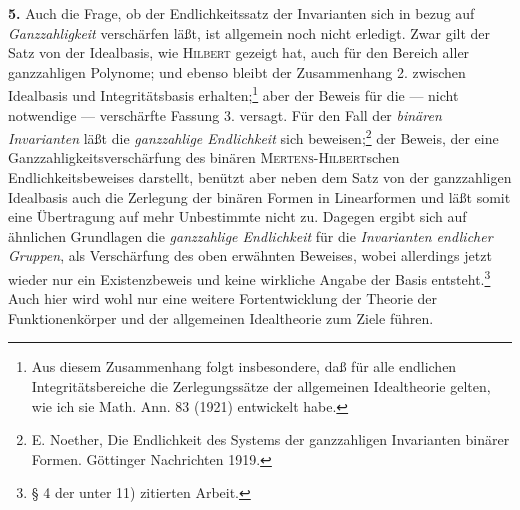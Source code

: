\textbf{5.} Auch die Frage, ob der Endlichkeitssatz der Invarianten sich in bezug auf \emph{Ganzzahligkeit} verschärfen läßt, ist allgemein noch nicht erledigt. Zwar gilt der Satz von der Idealbasis, wie \textsc{Hilbert} gezeigt hat, auch für den Bereich aller ganzzahligen Polynome; und ebenso bleibt der Zusammenhang 2. zwischen Idealbasis und Integritätsbasis erhalten;\footnote{Aus diesem Zusammenhang folgt insbesondere, daß für alle endlichen Integritätsbereiche die Zerlegungssätze der allgemeinen Idealtheorie gelten, wie ich sie Math. Ann. 83 (1921) entwickelt habe.} aber der Beweis für die --- nicht notwendige --- verschärfte Fassung 3. versagt. Für den Fall der \emph{binären Invarianten} läßt die \emph{ganzzahlige Endlichkeit} sich beweisen;\footnote{E. Noether, Die Endlichkeit des Systems der ganzzahligen Invarianten binärer Formen. Göttinger Nachrichten 1919.} der Beweis, der eine Ganzzahligkeitsverschärfung des binären \textsc{Mertens-Hilbert}schen Endlichkeitsbeweises darstellt, benützt aber neben dem Satz von der ganzzahligen Idealbasis auch die Zerlegung der binären Formen in Linearformen und läßt somit eine Übertragung auf mehr Unbestimmte nicht zu. Dagegen ergibt sich auf ähnlichen Grundlagen die \emph{ganzzahlige Endlichkeit} für die \emph{Invarianten endlicher Gruppen}, als Verschärfung des oben erwähnten Beweises, wobei allerdings jetzt wieder nur ein Existenzbeweis und keine wirkliche Angabe der Basis entsteht.\footnote{§ 4 der unter 11) zitierten Arbeit.} Auch hier wird wohl nur eine weitere Fortentwicklung der Theorie der Funktionenkörper und der allgemeinen Idealtheorie zum Ziele führen.

